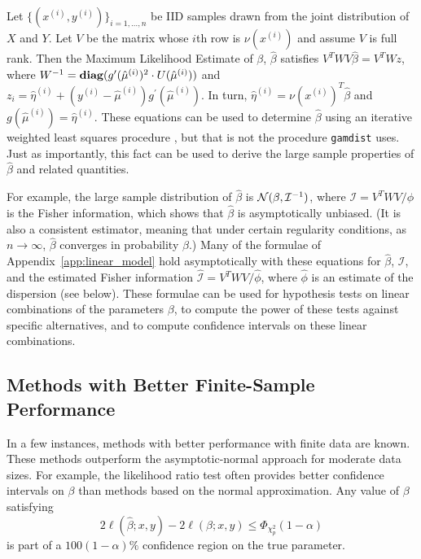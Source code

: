 \documentclass[12pt]{article}
\newcommand{\gamdist}{\texttt{gamdist}}
\begin{document}
Let $\{ (x^{(i)}, y^{(i)}) \}_{i=1, \ldots, n}$ be IID samples drawn from the joint distribution of $X$ and $Y$. Let $V$ be the matrix whose $i$th row is $\nu(x^{(i)})$ and assume $V$ is full rank. Then the Maximum Likelihood Estimate of $\beta$, $\hat{\beta}$ satisfies $V^T W V \hat{\beta} = V^T W z$, where $W^{-1} = \mathop{\bf diag}(g^\prime(\hat{\mu}^{(i)})^2 \cdot U(\hat{\mu}^{(i)}))$ and $z_i = \hat{\eta}^{(i)} + (y^{(i)} - \hat{\mu}^{(i)}) g^\prime(\hat{\mu}^{(i)})$. In turn, $\hat{\eta}^{(i)} = \nu(x^{(i)})^T \hat{\beta}$ and $g(\hat{\mu}^{(i)}) = \hat{\eta}^{(i)}$. These equations can be used to determine $\hat{\beta}$ using an iterative weighted least squares procedure \cite[\S 2.5]{MN:1983}, but that is not the procedure \gamdist{} uses. Just as importantly, this fact can be used to derive the large sample properties of $\hat{\beta}$ and related quantities.

For example, the large sample distribution of $\hat{\beta}$ is ${\mathcal N}(\beta,  \mathcal{I}^{-1})$, where $\mathcal{I} = V^T W V / \phi$ is the Fisher information, which shows that $\hat{\beta}$ is asymptotically unbiased. (It is also a consistent estimator, meaning that under certain regularity conditions, as $n \to \infty$, $\hat{\beta}$ converges in probability $\beta$.) Many of the formulae of Appendix~\ref{app:linear_model} hold asymptotically with these equations for $\hat{\beta}$, $\mathcal{I}$, and the estimated Fisher information $\hat{\mathcal{I}} = V^T W V / \hat{\phi}$, where $\hat{\phi}$ is an estimate of the dispersion (see below). These formulae can be used for hypothesis tests on linear combinations of the parameters $\beta$, to compute the power of these tests against specific alternatives, and to compute confidence intervals on these linear combinations.

\subsection{Methods with Better Finite-Sample Performance}
In a few instances, methods with better performance with finite data are known. These methods outperform the asymptotic-normal approach for moderate data sizes.  For example, the likelihood ratio test often provides better confidence intervals on $\beta$ than methods based on the normal approximation. Any value of $\beta$ satisfying 
\begin{displaymath}
   2 \ell(\hat{\beta}; x, y) - 2 \ell(\beta; x, y) \leq \Phi_{\chi_p^2}(1 - \alpha)
\end{displaymath}
is part of a $100(1-\alpha)\%$ confidence region on the true parameter.
\end{document}
